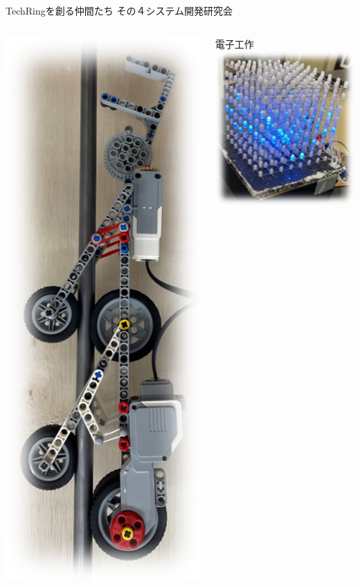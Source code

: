 \documentclass[dvipdfmx]{beamer}
\begin{document}
\begin{frame}{TechRingを創る仲間たち その４}{システム開発研究会}
\begin{footnotesize}
\begin{columns}[T,totalwidth=1.01\textwidth]
\begin{column}{.20\textwidth}
\begin{center}
          \includegraphics[scale=0.5,angle=30]{pic/shisuken2.png}
        \end{center}
      \end{column}
      \begin{column}{.20\textwidth}
        \begin{center}
          \alert{電子工作}\\
          \vspace{1mm}
          \includegraphics[scale=0.4]{pic/shisuken3.png}

\end{center}
\end{column}
\end{columns}
\end{footnotesize}
\end{frame}
\end{document}

